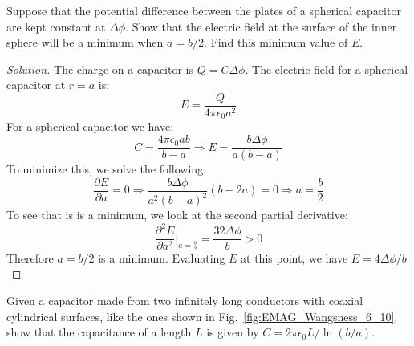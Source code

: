 \documentclass[crop=false,class=book,oneside]{standalone}
\begin{document}
            \begin{problem}[Wangsness 6-9]
                Suppose that the potential difference between
                the plates of a spherical capacitor are kept
                constant at $\Delta\phi$. Show that the electric
                field at the surface of the inner sphere will be
                a minimum when $a=b/2$.
                Find this minimum value of $E$.
            \end{problem}
            \begin{proof}[Solution]
                The charge on a capacitor is
                $Q=C\Delta\phi$.
                The electric field for a
                spherical capacitor at $r=a$ is:
                \begin{equation*}
                    E=\frac{Q}{4\pi\epsilon_{0}a^{2}}
                \end{equation*}
                For a spherical capacitor we have:
                \begin{equation*}
                    C=\frac{4\pi\epsilon_{0}ab}{b-a}
                    \Rightarrow
                    E=\frac{b\Delta\phi}{a(b-a)}
                \end{equation*}
                To minimize this, we solve the following:
                \begin{equation*}
                    \frac{\partial{E}}{\partial{a}}=0
                    \Rightarrow
                    \frac{b\Delta\phi}{a^{2}(b-a)^{2}}
                    (b-2a)=0
                    \Rightarrow
                    a=\frac{b}{2}
                \end{equation*}
                To see that is is a minimum, we look at the
                second partial derivative:
                \begin{equation*}
                    \frac{\partial^2 E}
                         {\partial a^2}\bigg|_{a=\frac{b}{2}}
                    =\frac{32\Delta\phi}{b}>0
                \end{equation*}
                Therefore $a=b/2$ is a minimum. Evaluating
                $E$ at this point, we have
                $E=4\Delta\phi/b$
            \end{proof}
            \begin{problem}[Wangsness 6-10]
                \label{problem:EMAG_Wangsness_6_10}
                Given a capacitor made from two infinitely
                long conductors with coaxial cylindrical surfaces,
                like the ones shown in
                Fig.~\ref{fig:EMAG_Wangsness_6_10},
                show that the capacitance of a length $L$
                is given by $C=2\pi\epsilon_{0}L/\ln(b/a)$.
            \end{problem}
\end{document}
